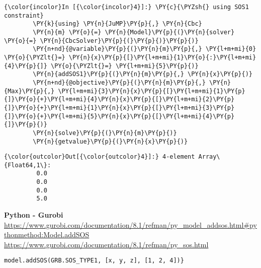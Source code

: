     \begin{Verbatim}[commandchars=\\\{\}]
{\color{incolor}In [{\color{incolor}4}]:} \PY{c}{\PYZsh{} using SOS1 constraint}
        \PY{k}{using} \PY{n}{JuMP}\PY{p}{,} \PY{n}{Cbc}
        \PY{n}{m} \PY{o}{=} \PY{n}{Model}\PY{p}{(}\PY{n}{solver} \PY{o}{=} \PY{n}{CbcSolver}\PY{p}{(}\PY{p}{)}\PY{p}{)}
        \PY{n+nd}{@variable}\PY{p}{(}\PY{n}{m}\PY{p}{,} \PY{l+m+mi}{0} \PY{o}{\PYZlt{}=} \PY{n}{x}\PY{p}{[}\PY{l+m+mi}{1}\PY{o}{:}\PY{l+m+mi}{4}\PY{p}{]} \PY{o}{\PYZlt{}=} \PY{l+m+mi}{5}\PY{p}{)}
        \PY{n}{addSOS1}\PY{p}{(}\PY{n}{m}\PY{p}{,} \PY{n}{x}\PY{p}{)}
        \PY{n+nd}{@objective}\PY{p}{(}\PY{n}{m}\PY{p}{,} \PY{n}{Max}\PY{p}{,} \PY{l+m+mi}{3}\PY{n}{x}\PY{p}{[}\PY{l+m+mi}{1}\PY{p}{]}\PY{o}{+}\PY{l+m+mi}{4}\PY{n}{x}\PY{p}{[}\PY{l+m+mi}{2}\PY{p}{]}\PY{o}{+}\PY{l+m+mi}{1}\PY{n}{x}\PY{p}{[}\PY{l+m+mi}{3}\PY{p}{]}\PY{o}{+}\PY{l+m+mi}{5}\PY{n}{x}\PY{p}{[}\PY{l+m+mi}{4}\PY{p}{]}\PY{p}{)}
        \PY{n}{solve}\PY{p}{(}\PY{n}{m}\PY{p}{)}
        \PY{n}{getvalue}\PY{p}{(}\PY{n}{x}\PY{p}{)}
\end{Verbatim}
%

\begin{Verbatim}[commandchars=\\\{\}]
{\color{outcolor}Out[{\color{outcolor}4}]:} 4-element Array\{Float64,1\}:
         0.0
         0.0
         0.0
         5.0
\end{Verbatim}

\textbf{Python - Gurobi}\\
\url{https://www.gurobi.com/documentation/8.1/refman/py_model_addsos.html#pythonmethod:Model.addSOS}\\
\url{https://www.gurobi.com/documentation/8.1/refman/py_sos.html}


\begin{verbatim}
model.addSOS(GRB.SOS_TYPE1, [x, y, z], [1, 2, 4])}
\end{verbatim}